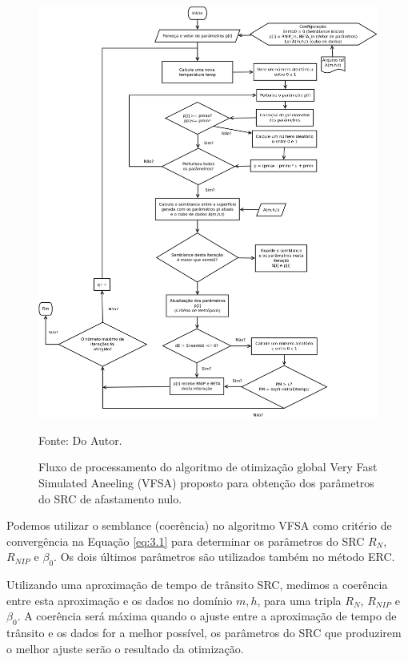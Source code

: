 \begin{figure}[htb]
\caption{Fluxo de processamento do algoritmo de otimização global Very Fast Simulated Aneeling (VFSA)
proposto para obtenção dos parâmetros do SRC de afastamento nulo.}
\begin{center}
\includegraphics[scale=0.45]{images/VFSA.png}
\vspace{-0.3cm}
\end{center}
\begin{center}
 Fonte: Do Autor.
\end{center}
\label{fig:2.1}
\end{figure}

Podemos utilizar o semblance (coerência) no algoritmo VFSA como critério de convergência na Equação \ref{eq:3.1}
para determinar os parâmetros do SRC $R_N$, $R_{NIP}$ e $\beta_0$. Os dois últimos parâmetros são utilizados também 
no método ERC.

Utilizando uma aproximação de tempo de trânsito SRC, medimos a coerência entre esta aproximação e os
dados no domínio $m, h$, para uma tripla $R_N$, $R_{NIP}$ e $\beta_0$.
A coerência será máxima quando o ajuste entre a aproximação de tempo de trânsito e os dados
for a melhor possível, os parâmetros do SRC que produzirem o melhor ajuste serão o resultado da otimização.

